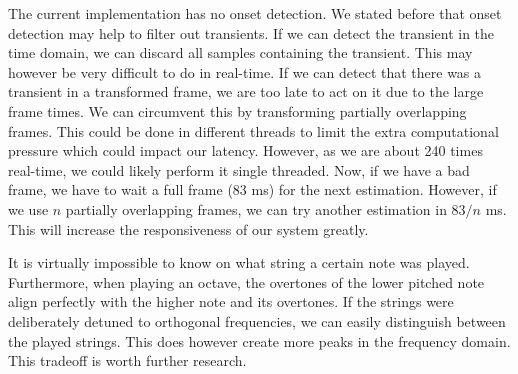 \documentclass[10pt,twocolumn]{article}
\begin{document}
The current implementation has no onset detection. We stated before that onset detection may help to filter out transients. If we can detect the transient in the time domain, we can discard all samples containing the transient. This may however be very difficult to do in real-time. If we can detect that there was a transient in a transformed frame, we are too late to act on it due to the large frame times. We can circumvent this by transforming partially overlapping frames. This could be done in different threads to limit the extra computational pressure which could impact our latency. However, as we are about 240 times real-time, we could likely perform it single threaded. Now, if we have a bad frame, we have to wait a full frame (83 ms) for the next estimation. However, if we use $n$ partially overlapping frames, we can try another estimation in $83/n$ ms. This will increase the responsiveness of our system greatly.

It is virtually impossible to know on what string a certain note was played. Furthermore, when playing an octave, the overtones of the lower pitched note align perfectly with the higher note and its overtones. If the strings were deliberately detuned to orthogonal frequencies, we can easily distinguish between the played strings. This does however create more peaks in the frequency domain. This tradeoff is worth further research.





\end{document}

